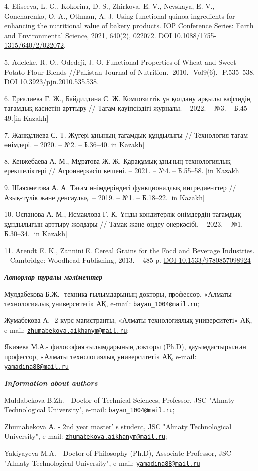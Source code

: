 4. Eliseeva, L. G., Kokorina, D. S., Zhirkova, E. V., Nevskaya, E. V.,
Goncharenko, O. A., Othman, A. J. Using functional quinoa ingredients
for enhancing the nutritional value of bakery products. IOP Conference
Series: Earth and Environmental Science, 2021, 640(2), 022072.
\href{https://doi.org/10.1088/1755-1315/640/2/022072}{DOI
10.1088/1755-1315/640/2/022072}.

5. Adeleke, R. O., Odedeji, J. O. Functional Properties of Wheat and
Sweet Potato Flour Blends //Pakistan Journal of Nutrition.-
2010. -Vol9(6).- P.535--538.
\href{https://doi.org/10.3923/pjn.2010.535.538}{DOI
10.3923/pjn.2010.535.538}.

6. Ерғалиева Г. Ж., Байдилдина С. Ж. Композиттік ұн қолдану арқылы
вафлидің тағамдық қасиетін арттыру // Тағам қауіпсіздігі журналы. --
2022. -- №3. -- Б.45--49.{[}in Kazakh{]}

7. Жанқұлиева С. Т. Жүгері ұнының тағамдық құндылығы // Технология тағам
өнімдері. -- 2020. -- №2. -- Б.36--40.{[}in Kazakh{]}

8. Кенжебаева А. М., Мұратова Ж. Ж. Қарақұмық ұнының технологиялық
ерекшеліктері // Агроөнеркәсіп кешені. -- 2021. -- №4. -- Б.55--58.
{[}in Kazakh{]}

9. Шаяхметова А. А. Тағам өнімдеріндегі функционалдық ингредиенттер //
Азық-түлік және денсаулық. -- 2019. -- №1. -- Б.18--22. {[}in Kazakh{]}

10. Оспанова А. М., Исмаилова Г. К. Ұнды кондитерлік өнімдердің тағамдық
құндылығын арттыру жолдары // Тамақ және өңдеу өнеркәсібі. -- 2023. --
№1. -- Б.30--34. {[}in Kazakh{]}

11. Arendt E. K., Zannini E. Cereal Grains for the Food and Beverage
Industries. -- Cambridge: Woodhead Publishing, 2013. -- 485 p.
\href{https://doi.org/10.1533/9780857098924}{DOI 10.1533/9780857098924}

\emph{{\bfseries Авторлар туралы мәліметтер}}

Мулдабекова Б.Ж.- техника ғылымдарының докторы, профессор, «Алматы
технологиялық университеті» АҚ, e-mail:
\href{mailto:bayan_1004@mail.ru}{\nolinkurl{bayan\_1004@mail.ru}};

Жумабекова А.- 2 курс магистранты, «Алматы технологиялық университеті»
АҚ, e-mail:
\href{mailto:zhumabekova.aikhanym@mail.ru}{\nolinkurl{zhumabekova.aikhanym@mail.ru}};

Якияева М.А.- философия ғылымдарының докторы (Ph.D), қауымдастырылған
профессор, «Алматы технологиялық университеті» АҚ, e-mail:
\href{mailto:yamadina88@mail.ru}{\nolinkurl{yamadina88@mail.ru}}

\emph{{\bfseries Information about authors}}

Muldabekova B.Zh. - Doctor of Technical Sciences, Professor, JSC "Almaty
Technological University", e-mail:
\href{mailto:bayan_1004@mail.ru}{\nolinkurl{bayan\_1004@mail.ru}};

Zhumabekova А. - 2nd year master' s student, JSC "Almaty
Technological University", e-mail:
\href{mailto:zhumabekova.aikhanym@mail.ru}{\nolinkurl{zhumabekova.aikhanym@mail.ru}};

Yakiyayeva M.A. - Doctor of Philosophy (Ph.D), Associate Professor, JSC
"Almaty Technological University", e-mail:
\href{mailto:yamadina88@mail.ru}{\nolinkurl{yamadina88@mail.ru}}\